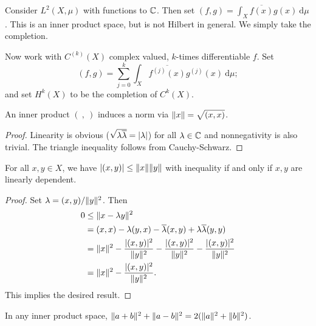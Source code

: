\documentclass[10pt, twoside]{article}
\renewcommand{\d}{\ \mathrm{d}}
\begin{document}
    \begin{exm} Consider $L^2(X,\mu)$ with functions to $\mathbb{C}$. Then set $(f,g) =
    \int_X \overline{f(x)}g(x) \d\mu$. This is an inner product space, but is
not Hilbert in general. We simply take the completion.  \end{exm}

    \begin{exm} Now work with $C^{(k)}(X)$ complex valued, $k$-times
        differentiable $f$. Set \[(f,g) = \sum_{j=0}^k \int_X
        \overline{f^{(j)}(x)}g^{(j)}(x) \d\mu; \] and set $H^k(X)$ to be the
    completion of $C^k(X)$.  \end{exm}

    \begin{lem} An inner product $(\ ,\ )$ induces a norm via $\lVert x\rVert =
        \sqrt{(x,x)}$.  \begin{proof} Linearity is obvious ($\sqrt{\lambda
            \overline{\lambda}} = \lvert\lambda\rvert$) for all $\lambda \in \mathbb{C}$ and
            nonnegativity is also trivial. The triangle inequality follows from
            Cauchy-Schwarz.  \end{proof} \end{lem}

    \begin{thm} For all $x,y \in X$, we have $\lvert(x,y)\rvert \leq
        \lVert x\rVert \lVert y\rVert$ with inequality if and only if $x,y$ are linearly
        dependent.  \begin{proof} Set $\lambda = (x,y)/\lVert y\rVert^2$. Then
            \begin{align*} 0 &\leq \lVert x - \lambda y\rVert^2 \\ &= (x,x) -
                \lambda(y,x) - \overline{\lambda}(x,y) + \lambda
                \overline{\lambda}(y,y)\\ &= \lVert x\rVert^2 -
                \frac{\lvert(x,y)\rvert^2}{\lVert y\rVert^2} -
                \frac{\lvert(x,y)\rvert^2}{\lVert y\rVert^2} -
                \frac{\lvert(x,y)\rvert^2}{\lVert y\rVert^2} \\ &= \lVert x\rVert^2 -
            \frac{\lvert(x,y)\rvert^2}{\lVert y\rVert^2}. \\ \end{align*} This implies the
        desired result.  \end{proof} \end{thm}

    \begin{thm} In any inner product space, $\lVert a+b\rVert^2 +
    \lVert a-b\rVert^2 = 2(\lVert a\rVert^2 + \lVert b\rVert^2)$.  \end{thm}
\end{document}

